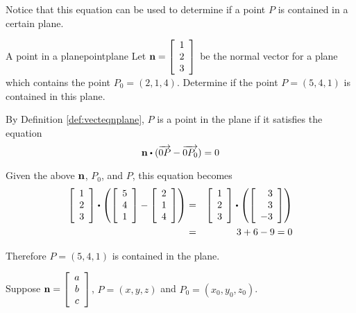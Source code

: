 Notice that this equation can be used to determine if a point $P$ is contained in a certain plane. 

\begin{example}{A point in a plane}{pointplane}
Let ${\bf n} = 
\left[
\begin{array}{r}
1 \\
2 \\
3 
\end{array}
\right]$ be the normal vector for a plane which contains the point $P_0 = \left( 2, 1, 4 \right)$. Determine if the point $P = \left( 5, 4, 1 \right)$ is contained in this plane. 
\end{example}

\begin{solution}
By Definition \ref{def:vecteqnplane}, $P$ is a point in the plane if it satisfies the equation
\[
\vect{n} \dotprod (\longvect{0P} - \longvect{0P_0}) = 0
\]

Given the above ${\bf n}$, $P_0$, and $P$, this equation becomes
\begin{eqnarray*}
\leftB
\begin{array}{r}
1 \\
2 \\
3
\end{array}
\rightB
\dotprod
\left(
\leftB
\begin{array}{r}
5 \\
4 \\
1
\end{array}
\rightB
-
\leftB
\begin{array}{r}
2 \\
1 \\
4
\end{array}
\rightB
\right)
&=& 
\leftB
\begin{array}{r}
1 \\
2 \\
3
\end{array}
\rightB
\dotprod
\left(
\leftB
\begin{array}{r}
3 \\
3 \\
-3
\end{array}
\rightB
\right) \\
&=& 
3 + 6 - 9 = 0
\end{eqnarray*}

Therefore $P = ( 5, 4, 1)$ is contained in the plane.

\end{solution}

Suppose ${\bf n} = \left[
\begin{array}{c}
a \\
b \\
c
\end{array}
\right]$, $P = \left( x,y,z\right)$ and $P_0 = (x_0, y_0, z_0 )$.

